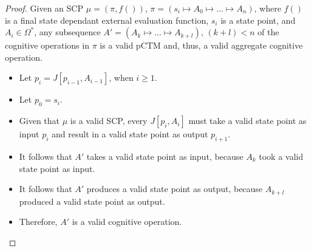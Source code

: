 \begin{proof} \label{proof:aggregateValid}
Given an SCP $\mu=(\pi,f())$, $\pi= (s_i \longmapsto A_0 \longmapsto ... \longmapsto A_n)$, where $f()$ is a final state dependant external evaluation function, $s_i$ is a state point, and $A_i \in \Omega^*$, any subsequence $A'=(A_k \longmapsto ... \longmapsto A_{k+l})$, $(k+l)<n$ of the cognitive operations in $\pi$ is a valid pCTM and, thus, a valid aggregate cognitive operation.
\begin{itemize}
\item Let $p_i=J[p_{i-1},A_{i-1}]$, when $i\geq 1$.
\item Let $p_0=s_i$.
\item Given that $\mu$ is a valid SCP, every $J[p_i,A_i]$ must take a valid state point as input $p_i$ and result in a valid state point as output $p_{i+1}$.
\item It follows that $A'$ takes a valid state point as input, because $A_k$ took a valid state point as input.
\item It follows that $A'$ produces a valid state point as output, because $A_{k+l}$ produced a valid state point as output.
\item Therefore, $A'$ is a valid cognitive operation.
\end{itemize}
\end{proof}


